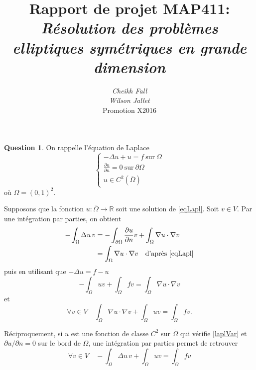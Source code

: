\documentclass[11pt]{article}
\title{
	\textbf{Rapport de projet MAP411}:\\
	\textit{Résolution des problèmes elliptiques symétriques en grande dimension}}
\author{
	\textit{Cheikh Fall}\\
	\textit{Wilson Jallet}\\
Promotion X2016}
\newcommand{\RR}{\mathbb R}
\theoremstyle{definition}
\newtheorem{ques}{Question}
\begin{document}
\maketitle

\begin{ques}
On rappelle l'équation de Laplace
\begin{equation}\label{eqLapl}
\left\{
\begin{array}{l}
-\Delta u + u = f\ \text{sur}\ \Omega \\
\frac{\partial u}{\partial n} = 0\ \text{sur}\ \partial\Omega \\
u \in C^2(\overline{\Omega})
\end{array}
\right.
\end{equation}
où $\Omega = (0,1)^2$.

Supposons que la fonction $u:\overline\Omega\longrightarrow\RR$ soit une solution de \eqref{eqLapl}. Soit $v\in V$. Par une intégration par parties, on obtient
\begin{align*}
-\int_\Omega \Delta u\, v &= -\int_{\partial\Omega} \frac{\partial u}{\partial n}v + \int_\Omega \nabla u\cdot \nabla v \\
&= \int_\Omega \nabla u\cdot \nabla v \quad \text{d'après \eqref{eqLapl}}
\end{align*}
puis en utilisant que $-\Delta u = f-u$
\[
	-\int_\Omega uv + \int_\Omega fv = \int_\Omega \nabla u\cdot \nabla v
\]
et
\begin{equation}\label{laplVar}
\forall v\in V\quad
\int_\Omega \nabla u\cdot \nabla v + \int_\Omega uv = \int_\Omega fv.
\end{equation}


Réciproquement, si $u$ est une fonction de classe $C^2$ sur $\overline\Omega$ qui vérifie \eqref{laplVar} et $\partial u/\partial n = 0$ sur le bord de $\Omega$, une intégration par parties permet de retrouver 
\[
\forall v\in V\quad  -\int_\Omega \Delta u\, v + \int_\Omega uv = \int_\Omega fv
\]


\end{ques}
\end{document}

